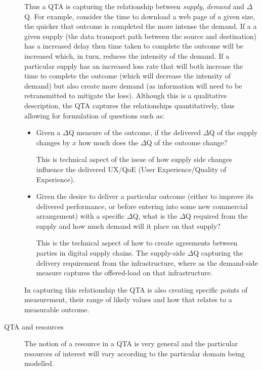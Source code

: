 \documentclass[11pt,a4paper]{article}
\begin{document}
\begin{description}
  Thus a QTA is capturing the relationship between \textit{supply},
  \textit{demand} and $\Delta$Q.  For example, consider the time to
  download a web page of a given size, the quicker that outcome is
  completed the more intense the demand. If a a given supply (the data
  transport path between the source and destination) has a increased
  delay then time taken to complete the outcome will be increased
  which, in turn, reduces the intensity of the demand. If a particular
  supply has an increased loss rate that will both increase the time
  to complete the outcome (which will decrease the intensity of
  demand) but also create more demand (as information will need to be
  retransmitted to mitigate the loss).  Although this is a qualitative
  description, the QTA captures the relationships quantitatively, thus
  allowing for formulation of questions such as:
  \begin{itemize}
    \item Given a $\Delta$Q measure of the outcome, if the delivered
      $\Delta$Q of the supply changes by $x$ how much does the
      $\Delta$Q of the outcome change?
      
      This is technical aspect of the issue of how supply side changes
      influence the delivered UX/QoE (User Experience/Quality of
      Experience).
    \item Given the desire to deliver a particular outcome (either to
      improve its delivered performance, or before entering into some
      new commercial arrangement) with a specific $\Delta$Q, what is
      the $\Delta$Q required from the supply and how much demand will
      it place on that supply?
      
      This is the technical aspect of how to create agreements between
      parties in digital supply chains. The supply-side $\Delta$Q
      capturing the delivery requirement from the infrastructure,
      where as the demand-side measure captures the offered-load on
      that infrastructure.
  \end{itemize}
    
  In capturing this relationship the QTA is also creating specific
  points of measurement, their range of likely values and how that
  relates to a measurable outcome.
\item[QTA and resources]
  The notion of a resource in a QTA is very general and the particular
  resources of interest will vary according to the particular domain being
  modelled.
   

\end{description}
\end{document}
